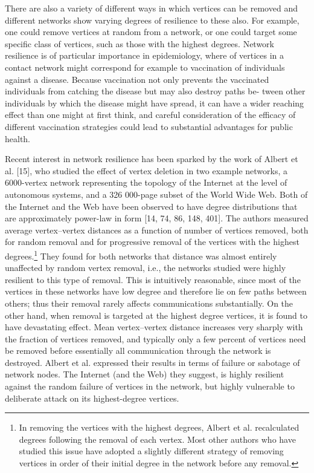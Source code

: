       There are also a variety of different ways in which vertices can be removed and different networks show varying degrees of resilience to these also. For example, one could remove vertices at random from a network, or one could target some specific class of vertices, such as those with the highest degrees. Network resilience is of particular importance in epidemiology, where  of vertices in a contact network might correspond for example to vaccination of individuals against a disease. Because vaccination not only prevents the vaccinated individuals from catching the disease but may also destroy paths be- tween other individuals by which the disease might have spread, it can have a wider reaching effect than one might at first think, and careful consideration of the efficacy of different vaccination strategies could lead to substantial advantages for public health.
      
      Recent interest in network resilience has been sparked by the work of Albert et al. [15], who studied the effect of vertex deletion in two example networks, a 6000-vertex network representing the topology of the Internet at the level of autonomous systems, and a 326 000-page subset of the World Wide Web. Both of the Internet and the Web have been observed to have degree distributions that are approximately power-law in form [14, 74, 86, 148, 401]. The authors measured average vertex–vertex distances as a function of number of vertices removed, both for random removal and for progressive removal of the vertices with the highest degrees.\footnote{In removing the vertices with the highest degrees, Albert et al. recalculated degrees following the removal of each vertex. Most other authors who have studied this issue have adopted a slightly different strategy of removing vertices in order of their initial degree in the network before any removal.} They found for both networks that distance was almost entirely unaffected by random vertex removal, i.e., the networks studied were highly resilient to this type of removal. This is intuitively reasonable, since most of the vertices in these networks have low degree and therefore lie on few paths between others; thus their removal rarely affects communications substantially. On the other hand, when removal is targeted at the highest degree vertices, it is found to have devastating effect. Mean vertex–vertex distance increases very sharply with the fraction of vertices removed, and typically only a few percent of vertices need be removed before essentially all communication through the network is destroyed. Albert et al. expressed their results in terms of failure or sabotage of network nodes. The Internet (and the Web) they suggest, is highly resilient against the random failure of vertices in the network, but highly vulnerable to deliberate attack on its highest-degree vertices.
      
